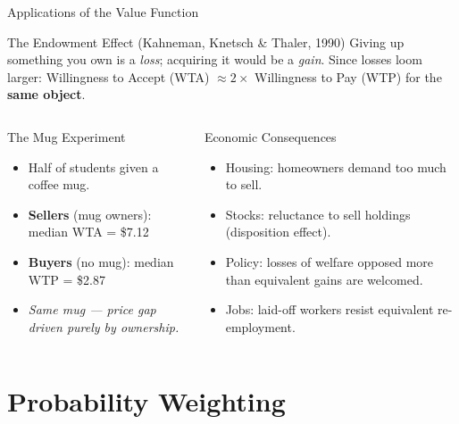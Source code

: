 \documentclass[aspectratio=169]{beamer}
\begin{document}
\begin{frame}{Applications of the Value Function}
\begin{block}{The Endowment Effect (Kahneman, Knetsch \& Thaler, 1990)}
Giving up something you own is a \textit{loss}; acquiring it would be a \textit{gain}. Since losses loom larger: Willingness to Accept (WTA) $\approx 2\times$ Willingness to Pay (WTP) for the \textbf{same object}.
\end{block}
\begin{columns}
\begin{exampleblock}{The Mug Experiment}
\begin{itemize}
  \item Half of students given a coffee mug.
  \item \textbf{Sellers} (mug owners): median WTA = \$7.12
  \item \textbf{Buyers} (no mug): median WTP = \$2.87
  \item \textit{Same mug --- price gap driven purely by ownership.}
\end{itemize}
\end{exampleblock}
\begin{alertblock}{Economic Consequences}
\begin{itemize}\small
  \item Housing: homeowners demand too much to sell.
  \item Stocks: reluctance to sell holdings (disposition effect).
  \item Policy: losses of welfare opposed more than equivalent gains are welcomed.
  \item Jobs: laid-off workers resist equivalent re-employment.
\end{itemize}
\end{alertblock}
\end{columns}
\end{frame}

\section{Probability Weighting}
\end{document}
